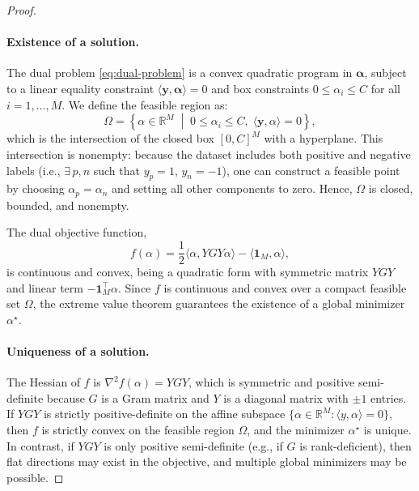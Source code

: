\begin{proof}
	\paragraph{Existence of a solution.}
	The dual problem \eqref{eq:dual-problem} is a convex quadratic program in $\symbf{\alpha}$, subject to a linear equality constraint $\langle \symbf{y}, \symbf{\alpha} \rangle = 0$ and box constraints $0 \leq \alpha_i \leq C$ for all $i = 1, \ldots, M$. We define the feasible region as:
	\[
		\Omega = \left\{ \alpha \in \mathbb{R}^M \;\middle|\; 0 \leq \alpha_i \leq C, \;\langle \symbf{y}, \alpha \rangle = 0 \right\},
	\]
	which is the intersection of the closed box $[0, C]^M$ with a hyperplane. This intersection is nonempty: because the dataset includes both positive and negative labels (i.e., $\exists\,p,n$ such that $y_p = 1$, $y_n = -1$), one can construct a feasible point by choosing $\alpha_p = \alpha_n$ and setting all other components to zero. Hence, $\Omega$ is closed, bounded, and nonempty.

	The dual objective function,
	\[
		f(\alpha) = \frac{1}{2} \langle \alpha, YGY \alpha \rangle - \langle \mathbf{1}_M, \alpha \rangle,
	\]
	is continuous and convex, being a quadratic form with symmetric matrix $YGY$ and linear term $- \mathbf{1}_M^\top \alpha$. Since $f$ is continuous and convex over a compact feasible set $\Omega$, the extreme value theorem guarantees the existence of a global minimizer $\alpha^\star$.

	\paragraph{Uniqueness of a solution.}
	The Hessian of $f$ is $\nabla^2 f(\alpha) = YGY$, which is symmetric and positive semi-definite because $G$ is a Gram matrix and $Y$ is a diagonal matrix with $\pm 1$ entries. If $YGY$ is strictly positive-definite on the affine subspace $\{\alpha \in \mathbb{R}^M : \langle y, \alpha \rangle = 0\}$, then $f$ is strictly convex on the feasible region $\Omega$, and the minimizer $\alpha^\star$ is unique. In contrast, if $YGY$ is only positive semi-definite (e.g., if $G$ is rank-deficient), then flat directions may exist in the objective, and multiple global minimizers may be possible.
\end{proof}



